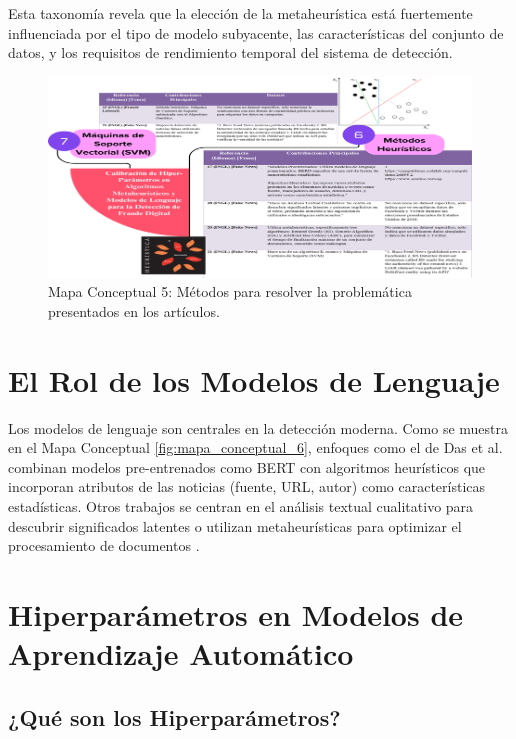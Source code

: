 Esta taxonomía revela que la elección de la metaheurística está fuertemente influenciada por el tipo de modelo subyacente, las características del conjunto de datos, y los requisitos de rendimiento temporal del sistema de detección.

\begin{figure}[h!]
    \centering
    \includegraphics[width=\textwidth]{Imagenes/mapaConceptual5.png}
    \caption{Mapa Conceptual 5: Métodos para resolver la problemática presentados en los artículos.}
    \label{fig:mapa_conceptual_5}
\end{figure}



\section{El Rol de los Modelos de Lenguaje}
Los modelos de lenguaje son centrales en la detección moderna. Como se muestra en el Mapa Conceptual \ref{fig:mapa_conceptual_6}, enfoques como el de Das et al. \cite{das2022heuristic} combinan modelos pre-entrenados como BERT con algoritmos heurísticos que incorporan atributos de las noticias (fuente, URL, autor) como características estadísticas. Otros trabajos se centran en el análisis textual cualitativo para descubrir significados latentes \cite{ali2020posttruth} o utilizan metaheurísticas para optimizar el procesamiento de documentos \cite{aqil2021modeling}.

\section{Hiperparámetros en Modelos de Aprendizaje Automático}
\label{sec:hiperparametros}

\subsection{¿Qué son los Hiperparámetros?}

